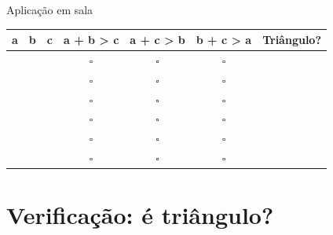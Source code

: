 \documentclass[12pt]{beamer}
\begin{document}
    \begin{frame}{Aplicação em sala}
    	\begin{table}[h]
    		\centering
    		\small
    		\setlength{\tabcolsep}{8pt}
    		\renewcommand{\arraystretch}{1.5}
    		
    		\begin{tabular}{|c|c|c||c|c|c||c|}
    			\hline
    			\textbf{a} & \textbf{b} & \textbf{c} & \textbf{a + b > c} & \textbf{a + c > b} & \textbf{b + c > a} & \textbf{Triângulo?} \\
    			\hline
    			& & & $\square$ & $\square$ & $\square$ & \\
    			\hline
    			& & & $\square$ & $\square$ & $\square$ & \\
    			\hline
    			& & & $\square$ & $\square$ & $\square$ & \\
    			\hline
    			& & & $\square$ & $\square$ & $\square$ & \\
    			\hline
    			& & & $\square$ & $\square$ & $\square$ & \\
    			\hline
    			& & & $\square$ & $\square$ & $\square$ & \\
    			\hline
    		\end{tabular}
    	\end{table}
    \end{frame}
    
\section{Verificação: é triângulo?}
\end{document}
